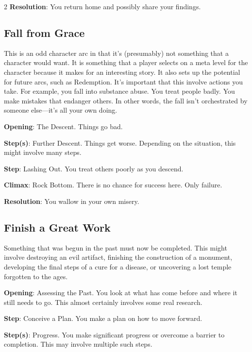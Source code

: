 \begin{multicols}{2}
\textbf{Resolution}: You return home and possibly share your findings.

\subsection{Fall from Grace}

This is an odd character arc in that it’s (presumably) not something that a character would want. It is something that a player selects on a meta level for the character because it makes for an interesting story. It also sets up the potential for future arcs, such as Redemption. It’s important that this involve actions you take. For example, you fall into substance abuse. You treat people badly. You make mistakes that endanger others. In other words, the fall isn’t orchestrated by someone else—it’s all your own doing.

\textbf{Opening}: The Descent. Things go bad.

\textbf{Step(s)}: Further Descent. Things get worse. Depending on the situation, this might involve many steps.

\textbf{Step}: Lashing Out. You treat others poorly as you descend.

\textbf{Climax}: Rock Bottom. There is no chance for success here. Only failure.

\textbf{Resolution}: You wallow in your own misery.

\subsection{Finish a Great Work}

Something that was begun in the past must now be completed. This might involve destroying an evil artifact, finishing the construction of a monument, developing the final steps of a cure for a disease, or uncovering a lost temple forgotten to the ages.

\textbf{Opening}: Assessing the Past. You look at what has come before and where it still needs to go. This almost certainly involves some real research.

\textbf{Step}: Conceive a Plan. You make a plan on how to move forward.

\textbf{Step(s)}: Progress. You make significant progress or overcome a barrier to completion. This may involve multiple such steps.


\end{multicols}
